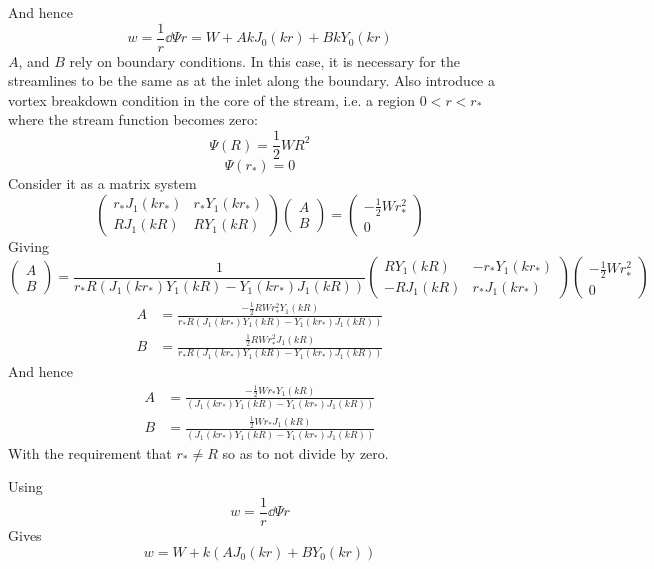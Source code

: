 \documentclass{X:/Documents/Coding/Latex/myreport}
\begin{document}
And hence
\[w = \frac1r \dd\Psi r = W + Ak J_0(kr) + Bk Y_0(kr)\]
$A$, and $B$ rely on boundary conditions. In this case, it is necessary for the streamlines to be the same as at the inlet along the boundary. Also introduce a vortex breakdown condition in the core of the stream, i.e. a region $0<r<r_*$ where the stream function becomes zero:
\[\Psi(R) = \frac12 WR^2\]
\[\Psi(r_*) = 0 \]
Consider it as a matrix system
\[
\begin{pmatrix}
r_*J_1(kr_*) & r_*Y_1(kr_*)\\
RJ_1(kR) & RY_1(kR)
\end{pmatrix}\begin{pmatrix}
A\\B
\end{pmatrix} = 
\begin{pmatrix}
-\frac12 Wr_*^2\\0
\end{pmatrix}
\]
Giving
\[
\begin{pmatrix}
A\\B
\end{pmatrix} = 
\frac{1}{r_* R\left(J_1(kr_*)Y_1(kR) - Y_1(kr_*)J_1(kR)\right)}
\begin{pmatrix}
RY_1(kR) & -r_*Y_1(kr_*)\\
-RJ_1(kR) & r_*J_1(kr_*)
\end{pmatrix}
\begin{pmatrix}
-\frac12 Wr_*^2\\0
\end{pmatrix}
\]
\begin{align*}
    A&= \frac{-\frac12 RW r_*^2 Y_1(kR)}{r_*R\left(J_1(kr_*)Y_1(kR) - Y_1(kr_*)J_1(kR)\right)}\\
B&=\frac{\frac12 RW r_*^2 J_1(kR)}{r_*R\left(J_1(kr_*)Y_1(kR) - Y_1(kr_*)J_1(kR)\right)}
\end{align*}
And hence
\begin{align*}
    A&= \frac{-\frac12 W r_*Y_1(kR)}{\left(J_1(kr_*)Y_1(kR) - Y_1(kr_*)J_1(kR)\right)}\\
B&=\frac{\frac12 W r_* J_1(kR)}{\left(J_1(kr_*)Y_1(kR) - Y_1(kr_*)J_1(kR)\right)}
\end{align*}
With the requirement that $r_* \neq R$ so as to not divide by zero.


Using 
\[w = \frac1r \dd\Psi r\] 
Gives
\[w = W + k(AJ_0(kr) + BY_0(kr))\]
\end{document}
